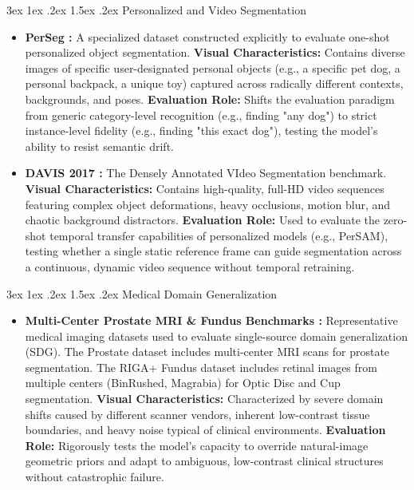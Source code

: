 \documentclass[journal,12pt,onecolumn,draftclsnofoot]{IEEEtran}
\makeatletter
\renewcommand{\subsection}{\@startsection{subsection}{2}{\z@}%
    {3ex \@plus 1ex \@minus .2ex}%
    {1.5ex \@plus.2ex}%
    {\normalfont\large\bfseries}}
\makeatother
\begin{document}
\subsection{Personalized and Video Segmentation}
\begin{itemize}
    \item \textbf{PerSeg \cite{zhang2024persam}:} A specialized dataset constructed explicitly to evaluate one-shot personalized object segmentation.
    \textbf{Visual Characteristics:} Contains diverse images of specific user-designated personal objects (e.g., a specific pet dog, a personal backpack, a unique toy) captured across radically different contexts, backgrounds, and poses.
    \textbf{Evaluation Role:} Shifts the evaluation paradigm from generic category-level recognition (e.g., finding "any dog") to strict instance-level fidelity (e.g., finding "this exact dog"), testing the model's ability to resist semantic drift.
    
    \item \textbf{DAVIS 2017 \cite{pont2017the}:} The Densely Annotated VIdeo Segmentation benchmark. 
    \textbf{Visual Characteristics:} Contains high-quality, full-HD video sequences featuring complex object deformations, heavy occlusions, motion blur, and chaotic background distractors.
    \textbf{Evaluation Role:} Used to evaluate the zero-shot temporal transfer capabilities of personalized models (e.g., PerSAM), testing whether a single static reference frame can guide segmentation across a continuous, dynamic video sequence without temporal retraining.
\end{itemize}

\subsection{Medical Domain Generalization}
\begin{itemize}
    \item \textbf{Multi-Center Prostate MRI \& Fundus Benchmarks \cite{wei2024prompting}:} Representative medical imaging datasets used to evaluate single-source domain generalization (SDG). The Prostate dataset includes multi-center MRI scans for prostate segmentation. The RIGA+ Fundus dataset includes retinal images from multiple centers (BinRushed, Magrabia) for Optic Disc and Cup segmentation.
    \textbf{Visual Characteristics:} Characterized by severe domain shifts caused by different scanner vendors, inherent low-contrast tissue boundaries, and heavy noise typical of clinical environments.
    \textbf{Evaluation Role:} Rigorously tests the model's capacity to override natural-image geometric priors and adapt to ambiguous, low-contrast clinical structures without catastrophic failure.
\end{itemize}
\end{document}
